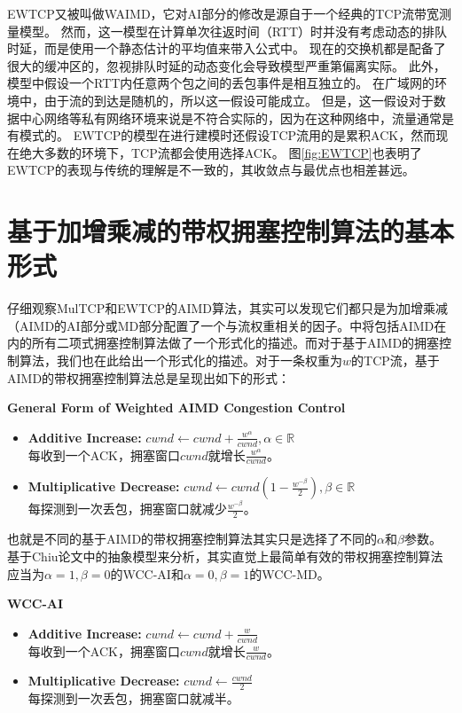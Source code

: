 \documentclass[winfonts]{njuthesis}
\begin{document}
EWTCP又被叫做WAIMD\cite{Honda2009EWTCP}，它对AI部分的修改是源自于一个经典的TCP流带宽测量模型\cite{padhye1998modeling}。
然而，这一模型在计算单次往返时间（RTT）时并没有考虑动态的排队时延，而是使用一个静态估计的平均值来带入公式中。
现在的交换机都是配备了很大的缓冲区的\cite{Jim2012Bufferbloat}，忽视排队时延的动态变化会导致模型严重第偏离实际。
此外，模型中假设一个RTT内任意两个包之间的丢包事件是相互独立的。
在广域网的环境中，由于流的到达是随机的，所以这一假设可能成立。
但是，这一假设对于数据中心网络等私有网络环境来说是不符合实际的，因为在这种网络中，流量通常是有模式的。
EWTCP的模型在进行建模时还假设TCP流用的是累积ACK，然而现在绝大多数的环境下，TCP流都会使用选择ACK。
图\ref{fig:EWTCP}也表明了EWTCP的表现与传统的理解是不一致的，其收敛点与最优点也相差甚远。

\section{基于加增乘减的带权拥塞控制算法的基本形式}

仔细观察MulTCP和EWTCP的AIMD算法，其实可以发现它们都只是为加增乘减（AIMD的AI部分或MD部分配置了一个与流权重相关的因子。\cite{bansal2001binomial}中将包括AIMD在内的所有二项式拥塞控制算法做了一个形式化的描述。而对于基于AIMD的拥塞控制算法，我们也在此给出一个形式化的描述。对于一条权重为$w$的TCP流，基于AIMD的带权拥塞控制算法总是呈现出如下的形式：

\textbf{\large General Form of Weighted AIMD Congestion Control}
\begin{itemize}
  \item {\bf Additive Increase:} $cwnd \leftarrow cwnd + \frac{w^\alpha}{cwnd}, \alpha \in \mathbb{R}$ \\
  每收到一个ACK，拥塞窗口$cwnd$就增长$\frac{w^\alpha}{cwnd}$。
  \item {\bf Multiplicative Decrease:} $cwnd \leftarrow cwnd (1 - \frac{w^{-\beta}}{2}), \beta \in \mathbb{R}$ \\
  每探测到一次丢包，拥塞窗口就减少$\frac{w^{-\beta}}{2}$。
\end{itemize}
也就是不同的基于AIMD的带权拥塞控制算法其实只是选择了不同的$\alpha$和$\beta$参数。
基于Chiu论文\cite{chiu1989analysis}中的抽象模型来分析，其实直觉上最简单有效的带权拥塞控制算法应当为$\alpha=1,\beta=0$的WCC-AI和$\alpha=0,\beta=1$的WCC-MD。

\textbf{\large WCC-AI}
\begin{itemize}
  \item {\bf Additive Increase:} $cwnd \leftarrow cwnd + \frac{w}{cwnd}$ \\
  每收到一个ACK，拥塞窗口$cwnd$就增长$\frac{w}{cwnd}$。
  \item {\bf Multiplicative Decrease:} $cwnd \leftarrow \frac{cwnd}{2}$ \\
  每探测到一次丢包，拥塞窗口就减半。
\end{itemize}
\end{document}
